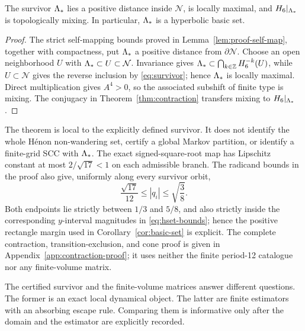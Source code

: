 \begin{corollary}
\label{cor:basic-set}
The survivor $\Lambda_*$ lies a positive distance inside $\mathcal N$, is locally
maximal, and $H_6|_{\Lambda_*}$ is topologically mixing.  In particular,
$\Lambda_*$ is a hyperbolic basic set.
\end{corollary}

\begin{proof}
The strict self-mapping bounds proved in
Lemma~\ref{lem:proof-self-map}, together with compactness, put $\Lambda_*$ a
positive distance from $\partial\mathcal N$.  Choose an open neighborhood
$U$ with $\Lambda_*\subset U\subset\mathcal N$.  Invariance gives
$\Lambda_*\subset\bigcap_{k\in\mathbb Z}H_6^{-k}(U)$, while $U\subset\mathcal N$
gives the reverse inclusion by \eqref{eq:survivor}; hence $\Lambda_*$ is locally
maximal.  Direct multiplication gives $A^4>0$, so the associated subshift of
finite type is mixing.  The conjugacy in Theorem~\ref{thm:contraction}
transfers mixing to $H_6|_{\Lambda_*}$.
\end{proof}

The theorem is local to the explicitly defined survivor.  It does not identify
the whole H\'enon non-wandering set, certify a global Markov partition, or
identify a finite-grid SCC with $\Lambda_*$.  The exact signed-square-root map has
Lipschitz constant at most $2/\sqrt{17}<1$ on each admissible branch.  The
radicand bounds in the proof also give, uniformly along every survivor orbit,
\begin{equation}
 \frac{\sqrt{17}}{12}\leq |q_i|\leq\sqrt{\frac38}.
 \label{eq:survivor-interior-bound}
\end{equation}
Both endpoints lie strictly between $1/3$ and $5/8$, and also strictly inside
the corresponding $y$-interval magnitudes in \eqref{eq:hset-bounds}; hence the
positive rectangle margin used in Corollary~\ref{cor:basic-set} is explicit.
The complete contraction, transition-exclusion, and cone proof is given in
Appendix~\ref{app:contraction-proof}; it uses neither the finite period-12
catalogue nor any finite-volume matrix.

\begin{remark}
The certified survivor and the finite-volume matrices answer different
questions.  The former is an exact local dynamical object.  The latter are
finite estimators with an absorbing escape rule.  Comparing them is informative
only after the domain and the estimator are explicitly recorded.
\end{remark}

